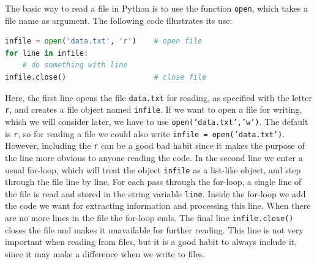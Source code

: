 \documentclass[graybox,envcountchap,sectrefs,final]{svmonodo}
\begin{document}
The basic way to read a file in Python is to use the function \texttt{open}, which takes a file name as argument. The following code illustrates its use:
\begin{lstlisting}[language=Python,style=blue1]
infile = open('data.txt', 'r')    # open file
for line in infile:
    # do something with line
infile.close()                    # close file
\end{lstlisting}
Here, the first line opens the file \texttt{data.txt} for reading, as specified with the letter \texttt{r}, and creates a file object named
\texttt{infile}. If we want to open a file for writing, which we will consider later, we have to use \texttt{open('data.txt','w')}. The default
is \texttt{r}, so for reading a file we could also write \texttt{infile = open('data.txt')}. However, including the \texttt{r} can be a good bad
habit since it makes the purpose of the line more obvious to anyone reading the code. In the second line we enter a usual
for-loop, which will treat the object \texttt{infile} as a list-like object, and step through the file line by line. For each pass
through the for-loop, a single line of the file is read and stored in the string variable \texttt{line}. Inside the for-loop we add
the code we want for extracting information and processing this line. When there are no more lines in the file the for-loop ends.
The final line \texttt{infile.close()} closes the file and makes it unavailable for further reading. This line is not very important when
reading from files, but it is a good habit to always include it, since it may make a difference when we write to files.
\end{document}
